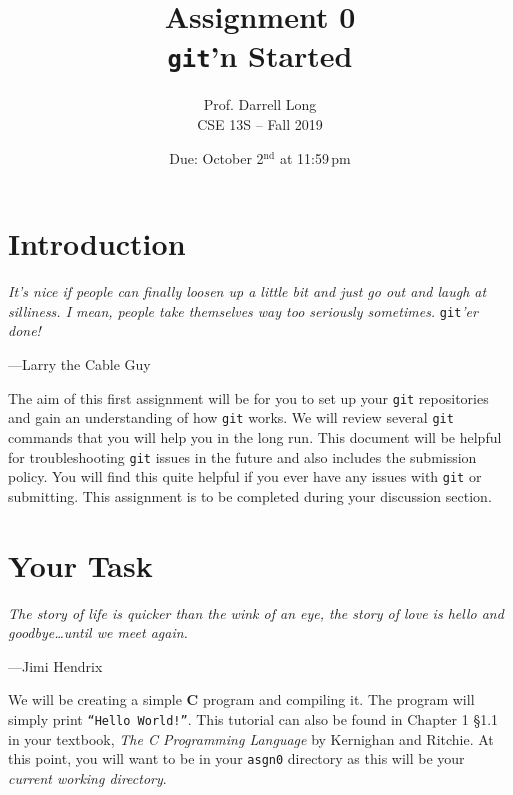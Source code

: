 \documentclass[11pt]{article}
\title{Assignment 0 \\ \texttt{git}'n Started}
\author{Prof. Darrell Long \\
CSE 13S -- Fall 2019}
\date{Due: October 2$^\text{nd}$ at 11:59\,pm}
\begin{document}
\maketitle

\section{Introduction}
\textwidth
\epigraph{\emph{It's nice if people can finally loosen up a little bit
and just go out and laugh at silliness. I mean, people take themselves
way too seriously sometimes.}  \texttt{git}\emph{'er done!}}{---Larry the
Cable Guy}

\noindent The aim of this first assignment will be for you to set up your
\texttt{git} repositories and gain an understanding of how \texttt{git}
works.  We will review several \texttt{git} commands that you will
help you in the long run. This document will be helpful for
troubleshooting \texttt{git} issues in the future and also includes
the submission policy. You will find this quite helpful if you ever
have any issues with \texttt{git} or submitting. This assignment
is to be completed during your discussion section.


\section{Your Task}
\epigraph{\emph{The story of life is quicker than the wink of an eye, the
story of love is hello and goodbye\ldots until we meet again.}}{---Jimi Hendrix}

\noindent We will be creating a simple \textbf{C} program and
compiling it.  The program will simply 
print \texttt{``Hello World!''}. This tutorial can also
be found in Chapter 1 \S 1.1 in your textbook, \textit{The C
Programming Language} by Kernighan and Ritchie. At this point, you
will want to be in your \texttt{asgn0} directory as this will
be your \emph{current working directory}.
\end{document}

